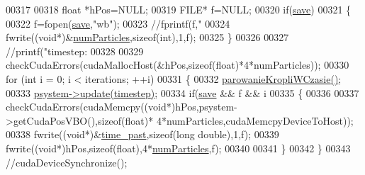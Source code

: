 \begin{DoxyCode}
{{00317 
00318         \textcolor{keywordtype}{float} *hPos=NULL;
00319         FILE* f=NULL;
00320         \textcolor{keywordflow}{if}(\hyperlink{particles_8cpp_ab3d416d86e212881d0e37a4bc52e138e}{save})
00321         \{
00322                 f=fopen(\hyperlink{particles_8cpp_ab3d416d86e212881d0e37a4bc52e138e}{save},\textcolor{stringliteral}{"wb"});
00323                 \textcolor{comment}{//fprintf(f,"%
00324                 fwrite((\textcolor{keywordtype}{void}*)&\hyperlink{particles_8cpp_a05b8a90212054a3eb1a036ae0c269596}{numParticles},\textcolor{keyword}{sizeof}(\textcolor{keywordtype}{int}),1,f);
00325         \}
00326 
00327         \textcolor{comment}{//printf("timestep: %
00328 
00329         checkCudaErrors(cudaMallocHost(&hPos,\textcolor{keyword}{sizeof}(\textcolor{keywordtype}{float})*4*numParticles));
00330     \textcolor{keywordflow}{for} (\textcolor{keywordtype}{int} i = 0; i < iterations; ++i)
00331     \{
00332                 \hyperlink{particles_8cpp_ad38a0dbec46194a94a86cfa6416ce48f}{parowanieKropliWCzasie}\hyperlink{particles_8cpp_ad38a0dbec46194a94a86cfa6416ce48f}{(}\hyperlink{particles_8cpp_ad38a0dbec46194a94a86cfa6416ce48f}{)};
00333         \hyperlink{particles_8cpp_a6fa81770b30ecffc7110864e64fe4fc5}{psystem}\hyperlink{class_particle_system_a166fd86f020b6024d7d42723762d7cb2}{->}\hyperlink{class_particle_system_a166fd86f020b6024d7d42723762d7cb2}{update}\hyperlink{class_particle_system_a166fd86f020b6024d7d42723762d7cb2}{(}\hyperlink{particles_8cpp_a30721fccdcf1a48ddb65267d3a5a9d29}{timestep}\hyperlink{class_particle_system_a166fd86f020b6024d7d42723762d7cb2}{)};
00334                 \textcolor{keywordflow}{if}(\hyperlink{particles_8cpp_ab3d416d86e212881d0e37a4bc52e138e}{save} && f && i%
00335                 \{
00336 
00337                         checkCudaErrors(cudaMemcpy((\textcolor{keywordtype}{void}*)hPos,psystem->getCudaPosVBO(),\textcolor{keyword}{sizeof}(\textcolor{keywordtype}{float})*
      4*numParticles,cudaMemcpyDeviceToHost));
00338                         fwrite((\textcolor{keywordtype}{void}*)&\hyperlink{particles_8cpp_ad6a23ec608122a4f7c824f903730f206}{time\_past},\textcolor{keyword}{sizeof}(\textcolor{keywordtype}{long} \textcolor{keywordtype}{double}),1,f);
00339                         fwrite((\textcolor{keywordtype}{void}*)hPos,\textcolor{keyword}{sizeof}(\textcolor{keywordtype}{float}),4*\hyperlink{particles_8cpp_a05b8a90212054a3eb1a036ae0c269596}{numParticles},f);
00340 
00341                 \}
00342     \}
00343         \textcolor{comment}{//cudaDeviceSynchronize();}
}}}}
\end{DoxyCode}
